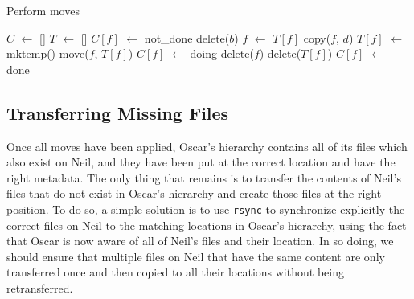 \documentclass[11pt]{llncs}
\newcommand*\Let[2]{\State #1 $\gets$ #2}
\newcommand{\rsync}{\texttt{rsync}\xspace}
\begin{document}
\begin{algorithm}
  \caption{Perform moves}
  \label{alg:moves}
  \begin{algorithmic}[1]
    \Statex
    \Let{$C$}{[]} 
    \Let{$T$}{[]} 
      \Let{$C[f]$}{not\_done}
    \EndFor
          \State delete($b$) 
        \Else
          \State {} 
        \EndIf
      \EndIf
        \Let{$f$}{$T[f]$}
      \EndIf
      \State copy($f$, $d$)
    \EndFunction
        \State \Return {}
      \EndIf
          \Let{$T[f]$}{mktemp()}
          \State move($f$, $T[f]$)
        \EndIf
        \State \Return {}
      \EndIf
      \Let{$C[f]$}{doing}
          \State {} 
        \EndIf
      \EndFor
        \State delete($f$)
      \EndIf
        \State delete($T[f]$)
      \EndIf
      \Let{$C[f]$}{done}
    \EndFunction

      \State {}
    \EndFor
  \end{algorithmic}
\end{algorithm}

\subsection{Transferring Missing Files}
\label{sec:transferring}

Once all moves have been applied, Oscar's hierarchy contains all of its files
which also exist on Neil, and they have been put at the correct location and have the right metadata. The
only thing that remains is to transfer the contents of Neil's files that do not
exist in Oscar's hierarchy and create those files at the right position. To do
so, a simple solution is to use \rsync to synchronize explicitly the correct
files on Neil to the matching locations in Oscar's hierarchy, using the fact that
Oscar is now aware of all of Neil's files and their location. In so doing, we should ensure that multiple files on Neil that have the same content are only transferred once and then copied to all their locations without being retransferred.
\end{document}
